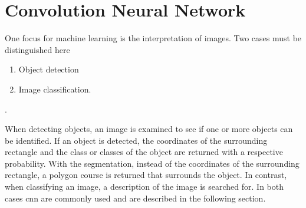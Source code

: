 %
%









\section{Convolution Neural Network}

One focus for machine learning is the interpretation of images. Two cases must be distinguished here

\begin{enumerate}
    \item Object detection
    \item Image classification.
    
\end{enumerate}. 

When detecting objects, an image is examined to see if one or more objects can be identified. If an object is detected, the coordinates of the surrounding rectangle and the class or classes of the object are returned with a respective probability. With the segmentation, instead of the coordinates of the surrounding rectangle, a polygon course is returned that surrounds the object. In contrast, when classifying an image, a description of the image is searched for. In both cases \ac{cnn} are commonly used and are described in the following section. 

